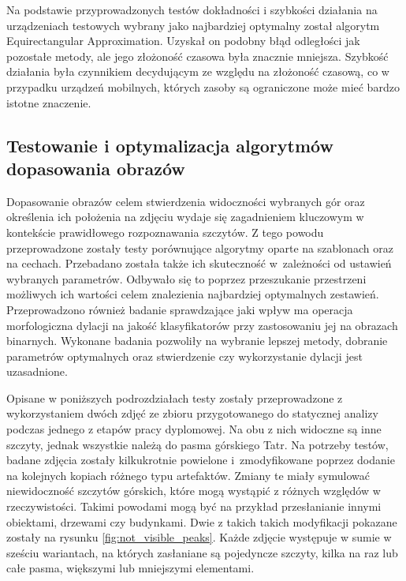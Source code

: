 Na podstawie przyprowadzonych testów dokładności i szybkości działania na urządzeniach testowych wybrany jako najbardziej optymalny został algorytm Equirectangular Approximation. Uzyskał on podobny błąd odległości jak pozostałe metody, ale jego złożoność czasowa była znacznie mniejsza. Szybkość działania była czynnikiem decydującym ze względu na złożoność czasową, co w przypadku urządzeń mobilnych, których zasoby są ograniczone może mieć bardzo istotne znaczenie. 



\subsection{Testowanie i optymalizacja algorytmów dopasowania obrazów} \label{sec:test_matching}

Dopasowanie obrazów celem stwierdzenia widoczności wybranych gór oraz określenia ich położenia na zdjęciu wydaje się zagadnieniem kluczowym w kontekście prawidłowego rozpoznawania szczytów. Z tego powodu przeprowadzone zostały testy porównujące algorytmy oparte na szablonach oraz na cechach. Przebadano została także ich skuteczność w~zależności od ustawień wybranych parametrów. Odbywało się to poprzez przeszukanie przestrzeni możliwych ich wartości celem znalezienia najbardziej optymalnych zestawień. Przeprowadzono również badanie sprawdzające jaki wpływ ma operacja morfologiczna dylacji na jakość klasyfikatorów przy zastosowaniu jej na obrazach binarnych. Wykonane badania pozwoliły na wybranie lepszej metody, dobranie parametrów optymalnych oraz stwierdzenie czy wykorzystanie dylacji jest uzasadnione.

Opisane w poniższych podrozdziałach testy zostały przeprowadzone z wykorzystaniem dwóch zdjęć ze zbioru przygotowanego do statycznej analizy podczas jednego z etapów pracy dyplomowej. Na obu z nich widoczne są inne szczyty, jednak wszystkie należą do pasma górskiego Tatr. Na potrzeby testów, badane zdjęcia zostały kilkukrotnie powielone i~zmodyfikowane poprzez dodanie na kolejnych kopiach różnego typu artefaktów. Zmiany te miały symulować niewidoczność szczytów górskich, które mogą wystąpić z różnych względów w rzeczywistości. Takimi powodami mogą być na przykład przesłanianie innymi obiektami, drzewami czy budynkami. Dwie z takich takich modyfikacji pokazane zostały na rysunku \ref{fig:not_visible_peaks}. Każde zdjęcie występuje w sumie w sześciu wariantach, na których zasłaniane są pojedyncze szczyty, kilka na raz lub całe pasma, większymi lub mniejszymi elementami. 


